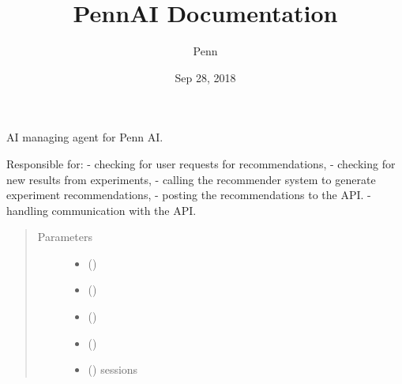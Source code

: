 \documentclass[letterpaper,10pt,english]{sphinxmanual}
\title{PennAI Documentation}
\date{Sep 28, 2018}
\author{Penn}
\begin{document}
\maketitle
\sphinxtableofcontents
{}\label{\detokenize{index::doc}}

\label{\detokenize{index:module-ai.ai}}

\begin{fulllineitems}
\label{\detokenize{index:ai.ai.AI}}
AI managing agent for Penn AI.

Responsible for:
- checking for user requests for recommendations,
- checking for new results from experiments,
- calling the recommender system to generate experiment recommendations,
- posting the recommendations to the API.
- handling communication with the API.
\begin{quote}\begin{description}
\item[{Parameters}] \leavevmode\begin{itemize}
\item {} 
 () \textendash{} 

\item {} 
 () \textendash{} 

\item {} 
 () \textendash{} 

\item {} 
 () \textendash{} 

\item {} 
 () \textendash{} sessions


\end{itemize}
\end{description}
\end{quote}
\end{fulllineitems}
\end{document}
